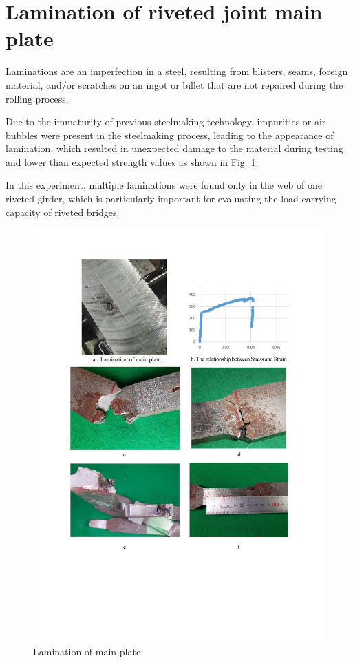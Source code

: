 \section{Lamination of riveted joint main plate}

Laminations are an imperfection in a steel, resulting from blisters, seams, foreign material, and/or scratches on an ingot or billet that are not repaired during the rolling process.

Due to the immaturity of previous steelmaking technology, impurities or air bubbles were present in the steelmaking process, leading to the appearance of lamination, which resulted in unexpected damage to the material during testing and lower than expected strength values as shown in Fig. \ref{fig-lami}.

In this experiment, multiple laminations were found only in the web of one riveted girder, which is particularly important for evaluating the load carrying capacity of riveted bridges.

\begin{figure}[htbp]
    \centering
    \includegraphics[width=1\linewidth]{imgs//app2/fig-lami.pdf}
    \caption{Lamination of main plate}
    \label{fig-lami}
\end{figure}